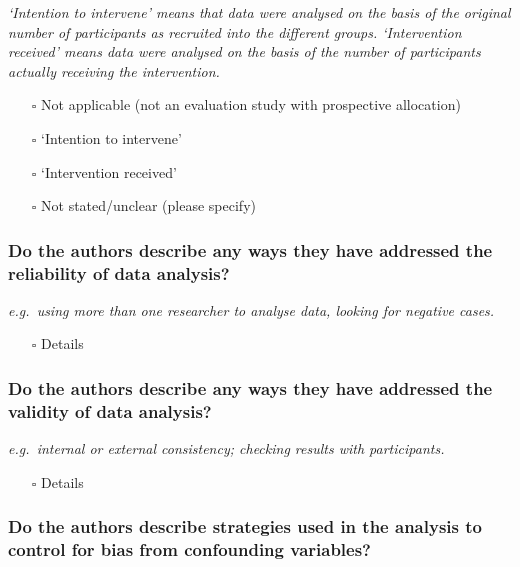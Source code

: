 \documentclass[
  doc, a4paper]{apa7}
\providecommand{\tightlist}{%
  \setlength{\itemsep}{0pt}\setlength{\parskip}{0pt}}
\begin{document}
\emph{`Intention to intervene' means that data were analysed on the basis of the original number of participants as recruited into the different groups. `Intervention received' means data were analysed on the basis of the number of participants actually receiving the intervention.}

\begin{itemize}
\tightlist
\item[$\square$]
  Not applicable (not an evaluation study with prospective allocation)
\item[$\square$]
  `Intention to intervene'
\item[$\square$]
  `Intervention received'
\item[$\square$]
  Not stated/unclear (please specify)
\end{itemize}

\subsubsection{Do the authors describe any ways they have addressed the reliability of data analysis?}\label{do-the-authors-describe-any-ways-they-have-addressed-the-reliability-of-data-analysis}

\emph{e.g.~using more than one researcher to analyse data, looking for negative cases.}

\begin{itemize}
\tightlist
\item[$\square$]
  Details
\end{itemize}

\subsubsection{Do the authors describe any ways they have addressed the validity of data analysis?}\label{do-the-authors-describe-any-ways-they-have-addressed-the-validity-of-data-analysis}

\emph{e.g.~internal or external consistency; checking results with participants.}

\begin{itemize}
\tightlist
\item[$\square$]
  Details
\end{itemize}

\subsubsection{Do the authors describe strategies used in the analysis to control for bias from confounding variables?}\label{do-the-authors-describe-strategies-used-in-the-analysis-to-control-for-bias-from-confounding-variables}
\end{document}
